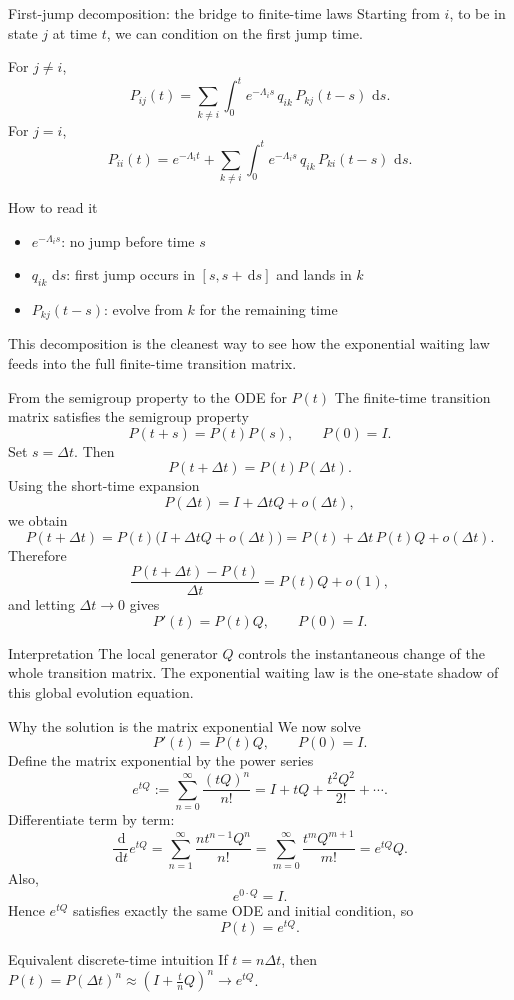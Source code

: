 \documentclass[aspectratio=169,professionalfonts]{beamer}
\newcommand{\dd}{\,\mathrm{d}}
\begin{document}
\begin{frame}{First-jump decomposition: the bridge to finite-time laws}
\small
Starting from $i$, to be in state $j$ at time $t$, we can condition on the first jump time.

For $j\neq i$,
\[
P_{ij}(t)=\sum_{k\neq i}\int_0^t e^{-\Lambda_i s}\,q_{ik}\,P_{kj}(t-s)\,\dd s.
\]
For $j=i$,
\[
P_{ii}(t)=e^{-\Lambda_i t}+\sum_{k\neq i}\int_0^t e^{-\Lambda_i s}\,q_{ik}\,P_{ki}(t-s)\,\dd s.
\]

\begin{block}{How to read it}
\begin{itemize}
  \item $e^{-\Lambda_i s}$: no jump before time $s$
  \item $q_{ik}\,\dd s$: first jump occurs in $[s,s+\dd s]$ and lands in $k$
  \item $P_{kj}(t-s)$: evolve from $k$ for the remaining time
\end{itemize}
\end{block}

This decomposition is the cleanest way to see how the exponential waiting law feeds into the full finite-time transition matrix.
\end{frame}

\begin{frame}{From the semigroup property to the ODE for $P(t)$}
\small
The finite-time transition matrix satisfies the semigroup property
\[
P(t+s)=P(t)P(s),
\qquad P(0)=I.
\]
Set $s=\Delta t$. Then
\[
P(t+\Delta t)=P(t)P(\Delta t).
\]
Using the short-time expansion
\[
P(\Delta t)=I+\Delta tQ+o(\Delta t),
\]
we obtain
\[
P(t+\Delta t)=P(t)\bigl(I+\Delta tQ+o(\Delta t)\bigr)
= P(t)+\Delta t\,P(t)Q+o(\Delta t).
\]
Therefore
\[
\frac{P(t+\Delta t)-P(t)}{\Delta t}=P(t)Q+o(1),
\]
and letting $\Delta t\to 0$ gives
\[
P'(t)=P(t)Q,
\qquad P(0)=I.
\]

\begin{block}{Interpretation}
The local generator $Q$ controls the instantaneous change of the whole transition matrix. The exponential waiting law is the one-state shadow of this global evolution equation.
\end{block}
\end{frame}

\begin{frame}{Why the solution is the matrix exponential}
\small
We now solve
\[
P'(t)=P(t)Q,
\qquad P(0)=I.
\]
Define the matrix exponential by the power series
\[
e^{tQ}:=\sum_{n=0}^{\infty}\frac{(tQ)^n}{n!}
=I+tQ+\frac{t^2Q^2}{2!}+\cdots.
\]
Differentiate term by term:
\[
\frac{\dd}{\dd t}e^{tQ}
=\sum_{n=1}^{\infty}\frac{n t^{n-1}Q^n}{n!}
=\sum_{m=0}^{\infty}\frac{t^mQ^{m+1}}{m!}
=e^{tQ}Q.
\]
Also,
\[
e^{0\cdot Q}=I.
\]
Hence $e^{tQ}$ satisfies exactly the same ODE and initial condition, so
\[
\boxed{P(t)=e^{tQ}}.
\]

\begin{alertblock}{Equivalent discrete-time intuition}
If $t=n\Delta t$, then $P(t)=P(\Delta t)^n\approx \left(I+\frac{t}{n}Q\right)^n \to e^{tQ}$.
\end{alertblock}
\end{frame}
\end{document}
